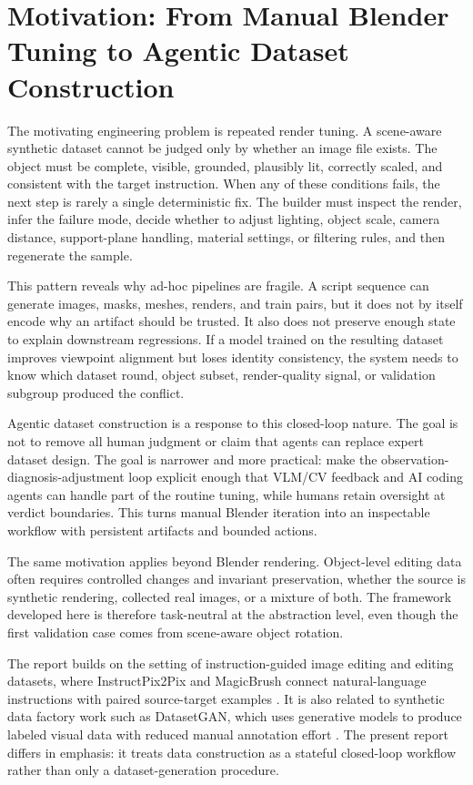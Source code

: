 \section{Motivation: From Manual Blender Tuning to Agentic Dataset Construction}
\label{sec:motivation}

The motivating engineering problem is repeated render tuning. A scene-aware synthetic dataset cannot be judged only by whether an image file exists. The object must be complete, visible, grounded, plausibly lit, correctly scaled, and consistent with the target instruction. When any of these conditions fails, the next step is rarely a single deterministic fix. The builder must inspect the render, infer the failure mode, decide whether to adjust lighting, object scale, camera distance, support-plane handling, material settings, or filtering rules, and then regenerate the sample.

This pattern reveals why ad-hoc pipelines are fragile. A script sequence can generate images, masks, meshes, renders, and train pairs, but it does not by itself encode why an artifact should be trusted. It also does not preserve enough state to explain downstream regressions. If a model trained on the resulting dataset improves viewpoint alignment but loses identity consistency, the system needs to know which dataset round, object subset, render-quality signal, or validation subgroup produced the conflict.

Agentic dataset construction is a response to this closed-loop nature. The goal is not to remove all human judgment or claim that agents can replace expert dataset design. The goal is narrower and more practical: make the observation-diagnosis-adjustment loop explicit enough that VLM/CV feedback and AI coding agents can handle part of the routine tuning, while humans retain oversight at verdict boundaries. This turns manual Blender iteration into an inspectable workflow with persistent artifacts and bounded actions.

The same motivation applies beyond Blender rendering. Object-level editing data often requires controlled changes and invariant preservation, whether the source is synthetic rendering, collected real images, or a mixture of both. The framework developed here is therefore task-neutral at the abstraction level, even though the first validation case comes from scene-aware object rotation.

The report builds on the setting of instruction-guided image editing and editing datasets, where InstructPix2Pix and MagicBrush connect natural-language instructions with paired source-target examples \cite{brooks2023instructpix2pix,zhang2023magicbrush}. It is also related to synthetic data factory work such as DatasetGAN, which uses generative models to produce labeled visual data with reduced manual annotation effort \cite{zhang2021datasetgan}. The present report differs in emphasis: it treats data construction as a stateful closed-loop workflow rather than only a dataset-generation procedure.

